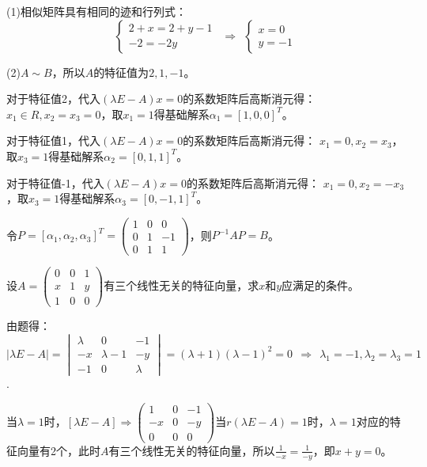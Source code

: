 \documentclass[a4paper]{report}
\begin{document}
\begin{jie}
(1)相似矩阵具有相同的迹和行列式：
\begin{equation*}
  \begin{cases}
   2+x=2+y-1\\
   -2=-2y
  \end{cases}~~\Rightarrow~~
  \begin{cases}
   x=0\\
   y=-1
  \end{cases}
\end{equation*}

(2)$A\sim B$，所以$A$的特征值为$2,1,-1$。

对于特征值2，代入$(\lambda E-A)x=0$的系数矩阵后高斯消元得：
$x_1\in R,x_2=x_3=0$，取$x_1=1$得基础解系$\alpha_1=[1,0,0]^T$。

对于特征值1，代入$(\lambda E-A)x=0$的系数矩阵后高斯消元得：
$x_1=0,x_2=x_3$，取$x_3=1$得基础解系$\alpha_2=[0,1,1]^T$。

对于特征值-1，代入$(\lambda E-A)x=0$的系数矩阵后高斯消元得：
$x_1=0,x_2=-x_3$，取$x_3=1$得基础解系$\alpha_3=[0,-1,1]^T$。

令$
P=[\alpha_1,\alpha_2,\alpha_3]^T=
\begin{pmatrix}
1&0&0\\
0&1&-1\\
0&1&1
\end{pmatrix}
$，则$P^{-1}AP=B$。
\end{jie}

\EX 设$A=
\begin{pmatrix}
0&0&1\\
x&1&y\\
1&0&0
\end{pmatrix}
$有三个线性无关的特征向量，求$x$和$y$应满足的条件。

\begin{jie}
由题得：$|\lambda E-A|=
\begin{vmatrix}
\lambda&0&-1\\
-x&\lambda-1&-y\\
-1&0&\lambda
\end{vmatrix}=(\lambda+1)(\lambda-1)^2=0~~\Rightarrow~~\lambda_1=-1,\lambda_2=\lambda_3=1
$.

当$\lambda=1$时，$[\lambda E-A]\Rightarrow
\begin{pmatrix}
1&0&-1\\
-x&0&-y\\
0&0&0
\end{pmatrix}$当$r(\lambda E-A)=1$时，$\lambda=1$对应的特征向量有2个，此时$A$有三个线性无关的特征向量，所以$
\frac{1}{-x}=\frac{1}{-y}
$，即$x+y=0$。
\end{jie}
\end{document}
